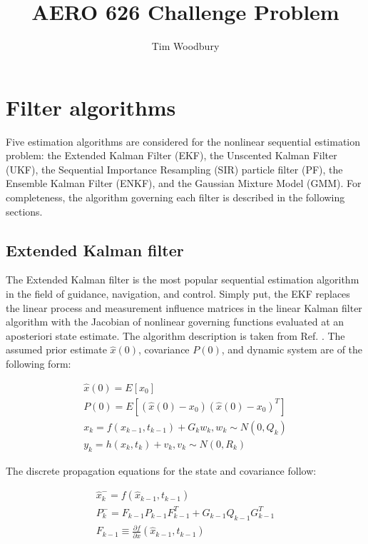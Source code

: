\documentclass[]{article}
\title{AERO 626 Challenge Problem}
\author{Tim Woodbury}
\begin{document}

\maketitle

\section{Filter algorithms}

Five estimation algorithms are considered for the nonlinear sequential estimation problem: the Extended Kalman Filter (EKF), the Unscented Kalman Filter (UKF), the Sequential Importance Resampling (SIR) particle filter (PF), the Ensemble Kalman Filter (ENKF), and the Gaussian Mixture Model (GMM). For completeness, the algorithm governing each filter is described in the following sections.

\subsection{Extended Kalman filter}

The Extended Kalman filter is the most popular sequential estimation algorithm in the field of guidance, navigation, and control. Simply put, the EKF replaces the linear process and measurement influence matrices in the linear Kalman filter algorithm with the Jacobian of nonlinear governing functions evaluated at an aposteriori state estimate. The algorithm description is taken from Ref. \cite{cassidis}. The assumed prior estimate $\hat{x}(0)$, covariance $P(0)$, and dynamic system are of the following form:

\begin{align}
\hat{x}(0) = E[x_0] \\
P(0) = E[(\hat{x}(0)-x_0)(\hat{x}(0)-x_0)^T] \\
x_k = f(x_{k-1},t_{k-1}) + G_k w_k, w_k \sim N(0,Q_k) \\
y_k = h(x_k,t_k) + v_k, v_k \sim N(0,R_k)
\end{align}

The discrete propagation equations for the state and covariance follow:

\begin{align}
\hat{x}_{k}^- = f(\hat{x}_{k-1},t_{k-1}) \\
P_{k}^- = F_{k-1}P_{k-1}F_{k-1}^T + G_{k-1}Q_{k-1}G_{k-1}^T \\
F_{k-1} \equiv \frac{\partial f}{\partial x} (\hat{x}_{k-1},t_{k-1})
\end{align}
\end{document}

